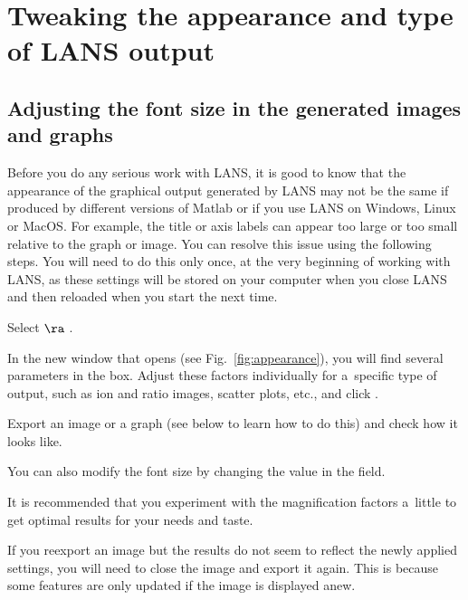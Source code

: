 \section{Tweaking the appearance and type of LANS output}
\label{sec:appearance}

\subsection{Adjusting the font size in the generated images and graphs}
\setcounter{step}{0}

Before you do any serious work with LANS, it is good to know that the appearance of the graphical output generated by LANS may not be the same if produced by different versions of Matlab or if you use LANS on Windows, Linux or MacOS. For example, the title or axis labels can appear too large or too small relative to the graph or image. You can resolve this issue using the following steps. You will need to do this only once, at the very beginning of working with LANS, as these settings will be stored on your computer when you close LANS and then reloaded when you start the next time. 

\s Select  $\ra$ .

\s In the new window that opens (see Fig.~\ref{fig:appearance}), you will find several parameters in the    box. Adjust these factors individually for a~specific type of output, such as ion and ratio images, scatter plots, etc., and click .

\s Export an image or a graph (see below to learn how to do this) and check how it looks like.

\s You can also modify the font size by changing the value in the  field.

\bul It is recommended that you experiment with the magnification factors a~little to get optimal results for your needs and taste. 

\bul If you reexport an image but the results do not seem to reflect the newly applied settings, you will need to close the image and export it again. This is because some features are only updated if the image is displayed anew.

